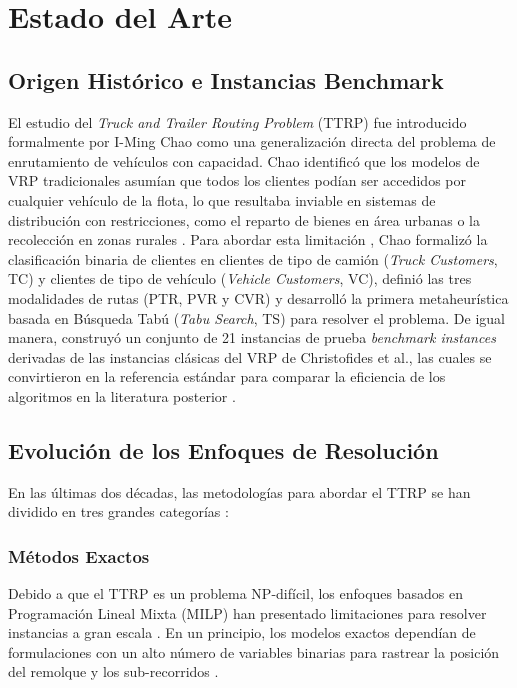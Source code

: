 \documentclass[letter, 10pt]{article}
\begin{document}
\section{Estado del Arte}


\subsection{Origen Hist\'orico e Instancias Benchmark}
El estudio del \textit{Truck and Trailer Routing Problem} (TTRP) fue introducido formalmente por I-Ming Chao \cite{chao2002tabu} como una generalizaci\'on directa del problema de enrutamiento de veh\'iculos con capacidad. 
Chao identific\'o que los modelos de VRP tradicionales asum\'ian que todos los clientes pod\'ian ser accedidos por cualquier veh\'iculo de la flota, lo que resultaba inviable en sistemas de distribuci\'on con restricciones, como el reparto de bienes en \'area urbanas o la recolecci\'on en zonas rurales \cite{chao2002tabu}.
Para abordar esta limitaci\'on , Chao formaliz\'o la clasificaci\'on binaria de clientes en clientes de tipo de cami\'on (\textit{Truck Customers}, TC) y clientes de tipo de veh\'iculo (\textit{Vehicle Customers}, VC), defini\'o las tres modalidades de rutas (PTR, PVR y CVR) y desarroll\'o la primera metaheur\'istica basada en B\'usqueda Tab\'u (\textit{Tabu Search}, TS) para resolver el problema.
De igual manera, construy\'o un conjunto de 21 instancias de prueba \textit{benchmark instances} derivadas de las instancias cl\'asicas del VRP de Christofides et al., las cuales se convirtieron en la referencia est\'andar para comparar la eficiencia de los algoritmos en la literatura posterior \cite{chao2002tabu, lin2009solving}.


\subsection{Evoluci\'on de los Enfoques de Resoluci\'on}

En las \'ultimas dos d\'ecadas, las metodolog\'ias para abordar el TTRP se han dividido en tres grandes categor\'ias \cite{lin2009solving, bartolini2020two}:

\subsubsection{M\'etodos Exactos}

Debido a que el TTRP es un problema NP-dif\'icil, los enfoques basados en Programaci\'on Lineal Mixta (MILP) han presentado limitaciones para resolver instancias a gran escala \cite{bartolini2020two}. 
En un principio, los modelos exactos depend\'ian de formulaciones con un alto n\'umero de variables binarias para rastrear la posici\'on del remolque y los sub-recorridos \cite{chao2002tabu}.
\end{document}
